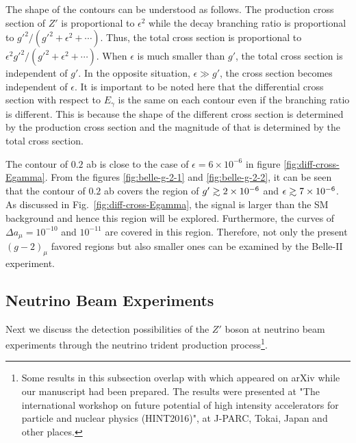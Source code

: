 \documentclass[preprint,amsmath,amssymb,superscriptaddress,nofootinbib]{revtex4}
\newcommand{\gsim}{\raise0.3ex\hbox{$\;>$\kern-0.75em\raise-1.1ex\hbox{$\sim\;$}}}
\begin{document}
The shape of the contours can be understood as follows. The production cross section of $Z'$ is proportional to 
$\epsilon^2$ while the decay branching ratio is proportional to $g'^2/(g'^2 + \epsilon^2 + \cdots)$. Thus, the total 
cross section is proportional to $\epsilon^2 g'^2/(g'^2 + \epsilon^2 + \cdots)$. When $\epsilon$ is much smaller 
than $g'$, the total cross section is independent of $g'$.  In the opposite situation, $\epsilon \gg g'$, the cross section 
becomes independent of $\epsilon$. 
It is important to be noted here that the differential cross section with respect to $E_\gamma$ is the same on 
each contour even if the branching ratio is different. This is because the shape of the different cross section is 
determined by the production cross 
section and the magnitude of that is determined by the total cross section.

The contour of $0.2$ ab is close to the case of $\epsilon = 6 \times 10^{-6}$ in figure \ref{fig:diff-cross-Egamma}. 
From the figures \ref{fig:belle-g-2-1} and \ref{fig:belle-g-2-2}, it can be seen that the contour of $0.2$ ab 
covers the region of $g' \gsim 2 \times 10^{-6}$ and $\epsilon \gsim 7 \times 10^{-6}$.  
As discussed in Fig.~\ref{fig:diff-cross-Egamma}, the signal is larger than the SM background and hence 
this region will be explored. 
%
Furthermore, the curves of $\Delta a_\mu = 10^{-10}$ and $10^{-11}$ are covered in this region. Therefore, not 
only the present $(g-2)_\mu$ favored regions but also smaller ones can be examined by the Belle-II experiment.

\subsection{Neutrino Beam Experiments}
Next we discuss the detection possibilities of the $Z'$ boson at neutrino beam experiments through 
the neutrino trident production process\footnote{Some results in this subsection overlap with \cite{Magill:2016hgc} which appeared on 
arXiv while our manuscript had been prepared. The results were presented at 
"The international workshop on future potential of high intensity accelerators for particle and nuclear physics (HINT2016)", at 
J-PARC, Tokai, Japan and other places.}. 
\end{document}
